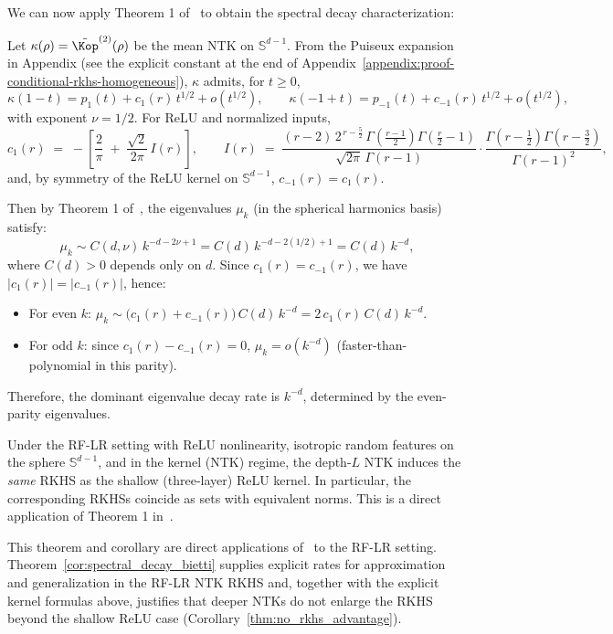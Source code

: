 We can now apply Theorem 1 of~\cite{bietti2021deepequalsshallowrelu} to obtain the spectral decay characterization:

\begin{theorem}\label{cor:spectral_decay_bietti}
Let \( \kappa(\rho) = \tilde{\Kop}^{(2)}(\rho) \) be the mean NTK on \( \mathbb{S}^{d-1} \). From the Puiseux expansion in Appendix (see the explicit constant at the end of Appendix~\ref{appendix:proof-conditional-rkhs-homogeneous}), \( \kappa \) admits, for \( t\ge 0 \),
\[
\kappa(1-t) = p_1(t) + c_1(r)\, t^{1/2} + o(t^{1/2}),\qquad
\kappa(-1+t) = p_{-1}(t) + c_{-1}(r)\, t^{1/2} + o(t^{1/2}),
\]
with exponent \( \nu = 1/2 \). For ReLU and normalized inputs,
\[
c_1(r) \;=\; -\left[\frac{2}{\pi} \;+\; \frac{\sqrt{2}}{2\pi}\,I(r)\right],
\qquad
I(r) \;=\; \frac{(r-2)\,2^{\,r-\frac{5}{2}}\,\Gamma\!\left(\frac{r-1}{2}\right)\Gamma\!\left(\frac{r}{2}-1\right)}{\sqrt{2\pi}\,\Gamma(r-1)}\cdot\frac{\Gamma\!\left(r-\tfrac{1}{2}\right)\Gamma\!\left(r-\tfrac{3}{2}\right)}{\Gamma(r-1)^2},
\]
and, by symmetry of the ReLU kernel on \( \mathbb{S}^{d-1} \), \( c_{-1}(r) = c_1(r) \).

Then by Theorem 1 of~\cite{bietti2021deepequalsshallowrelu}, the eigenvalues \( \mu_k \) (in the spherical harmonics basis) satisfy:
\[
\mu_k \sim C(d,\nu)\,k^{-d-2\nu+1} = C(d)\,k^{-d-2(1/2)+1} = C(d)\,k^{-d},
\]
where \( C(d) > 0 \) depends only on \( d \). Since \( c_1(r) = c_{-1}(r) \), we have \( |c_1(r)| = |c_{-1}(r)| \), hence:
\begin{itemize}
    \item For even \( k \): \( \mu_k \sim \big(c_1(r)+c_{-1}(r)\big)\,C(d)\,k^{-d} = 2\,c_1(r)\,C(d)\,k^{-d} \).
    \item For odd \( k \): since \( c_1(r) - c_{-1}(r) = 0 \), \( \mu_k = o(k^{-d}) \) (faster-than-polynomial in this parity).
\end{itemize}
Therefore, the dominant eigenvalue decay rate is \( k^{-d} \), determined by the even-parity eigenvalues.
\end{theorem}

\begin{corollary}\label{thm:no_rkhs_advantage}
Under the RF-LR setting with ReLU nonlinearity, isotropic random features on the sphere \( \mathbb{S}^{d-1} \), and in the kernel (NTK) regime, the depth-\(L\) NTK induces the \emph{same} RKHS as the shallow (three-layer) ReLU kernel. In particular, the corresponding RKHSs coincide as sets with equivalent norms. This is a direct application of Theorem 1 in~\cite{bietti2021deepequalsshallowrelu}.
\end{corollary}

\begin{remark}
This theorem and corollary are direct applications of~\cite{bietti2021deepequalsshallowrelu} to the RF-LR setting. Theorem~\ref{cor:spectral_decay_bietti} supplies explicit rates for approximation and generalization in the RF-LR NTK RKHS and, together with the explicit kernel formulas above, justifies that deeper NTKs do not enlarge the RKHS beyond the shallow ReLU case (Corollary~\ref{thm:no_rkhs_advantage}).
\end{remark}
